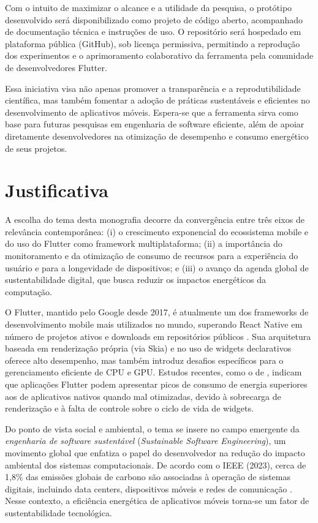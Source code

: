 \documentclass[12pt,a4paper,oneside]{abntex2}
\begin{document}
Com o intuito de maximizar o alcance e a utilidade da pesquisa, o protótipo desenvolvido será disponibilizado como projeto de código aberto, acompanhado de documentação técnica e instruções de uso. O repositório será hospedado em plataforma pública (GitHub), sob licença permissiva, permitindo a reprodução dos experimentos e o aprimoramento colaborativo da ferramenta pela comunidade de desenvolvedores Flutter.

Essa iniciativa visa não apenas promover a transparência e a reprodutibilidade científica, mas também fomentar a adoção de práticas sustentáveis e eficientes no desenvolvimento de aplicativos móveis. Espera-se que a ferramenta sirva como base para futuras pesquisas em engenharia de software eficiente, além de apoiar diretamente desenvolvedores na otimização de desempenho e consumo energético de seus projetos.

\section{Justificativa}
A escolha do tema desta monografia decorre da convergência entre três eixos de relevância contemporânea: (i) o crescimento exponencial do ecossistema mobile e do uso do Flutter como framework multiplataforma; (ii) a importância do monitoramento e da otimização de consumo de recursos para a experiência do usuário e para a longevidade de dispositivos; e (iii) o avanço da agenda global de sustentabilidade digital, que busca reduzir os impactos energéticos da computação.

  O Flutter, mantido pelo Google desde 2017, é atualmente um dos frameworks de desenvolvimento mobile mais utilizados no mundo, superando React Native em número de projetos ativos e downloads em repositórios públicos \cite{google2023flutter, meyer2022performance}. Sua arquitetura baseada em renderização própria (via Skia) e no uso de widgets declarativos oferece alto desempenho, mas também introduz desafios específicos para o gerenciamento eficiente de CPU e GPU. Estudos recentes, como o de \textcite{zhang2021energy}, indicam que aplicações Flutter podem apresentar picos de consumo de energia superiores aos de aplicativos nativos quando mal otimizadas, devido à sobrecarga de renderização e à falta de controle sobre o ciclo de vida de widgets.

Do ponto de vista social e ambiental, o tema se insere no campo emergente da \textit{engenharia de software sustentável} (\textit{Sustainable Software Engineering}), um movimento global que enfatiza o papel do desenvolvedor na redução do impacto ambiental dos sistemas computacionais. De acordo com o IEEE (2023), cerca de 1,8\% das emissões globais de carbono são associadas à operação de sistemas digitais, incluindo data centers, dispositivos móveis e redes de comunicação \cite{ieee2023sustainability}. Nesse contexto, a eficiência energética de aplicativos móveis torna-se um fator de sustentabilidade tecnológica.
\end{document}
